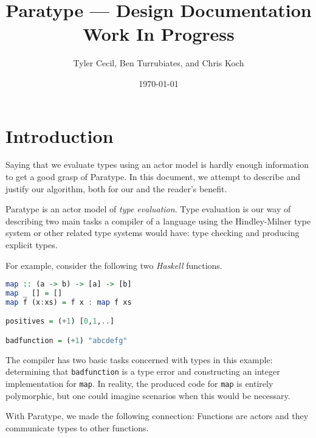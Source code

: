 \documentclass[10pt]{article}
\begin{document}
\renewcommand{\listofalgorithms}{\begingroup
	\tocfile{List of Algorithms}{loa}
	\endgroup
}
\makeatletter
\let\l@algorithm\l@figure
\makeatother
{}


\title{Paratype --- Design Documentation\\
Work In Progress}
\author{Tyler Cecil, Ben Turrubiates, and Chris Koch}
\date{\today}
\maketitle

\setlength{\parskip}{2pt}

\tableofcontents
\listofalgorithms
\setlength{\parskip}{6pt}

\pagebreak
\setcounter{page}{0}

\section{Introduction}
Saying that we evaluate types using an actor model is hardly enough information
to get a good grasp of Paratype. In this document, we attempt to
describe and justify our algorithm, both for our and the reader's benefit.

Paratype is an actor model of \emph{type evaluation}. Type evaluation is our
way of describing two main tasks a compiler of a language using the
Hindley-Milner type system or other related type systems would have: type
checking and producing explicit types.

For example, consider the following two \emph{Haskell} functions.
\begin{lstlisting}[language=Haskell,caption=Haskell example,label=lst:haskell]
map :: (a -> b) -> [a] -> [b]
map _ [] = []
map f (x:xs) = f x : map f xs

positives = (+1) [0,1,..]

badfunction = (+1) "abcdefg"
\end{lstlisting}

The compiler has two basic tasks concerned with types in this example:
determining that \lstinline!badfunction! is a type error and constructing an
integer implementation for \lstinline!map!. In reality, the produced code for
\lstinline!map! is entirely polymorphic, but one could imagine scenarios when
this would be necessary.

With Paratype, we made the following connection: Functions are actors and they
communicate types to other functions.
\end{document}

